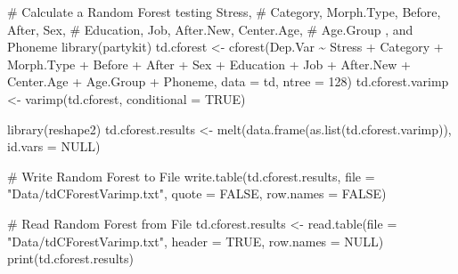 \documentclass[
  10pt,
  letterpaper]{article}
\newenvironment{Shaded}{\begin{snugshade}}{\end{snugshade}}
\newcommand{\AttributeTok}[1]{\textcolor[rgb]{0.40,0.45,0.13}{#1}}
\newcommand{\CommentTok}[1]{\textcolor[rgb]{0.37,0.37,0.37}{#1}}
\newcommand{\ConstantTok}[1]{\textcolor[rgb]{0.56,0.35,0.01}{#1}}
\newcommand{\DecValTok}[1]{\textcolor[rgb]{0.68,0.00,0.00}{#1}}
\newcommand{\FunctionTok}[1]{\textcolor[rgb]{0.28,0.35,0.67}{#1}}
\newcommand{\NormalTok}[1]{\textcolor[rgb]{0.00,0.23,0.31}{#1}}
\newcommand{\OtherTok}[1]{\textcolor[rgb]{0.00,0.23,0.31}{#1}}
\newcommand{\SpecialCharTok}[1]{\textcolor[rgb]{0.37,0.37,0.37}{#1}}
\newcommand{\StringTok}[1]{\textcolor[rgb]{0.13,0.47,0.30}{#1}}
\begin{document}
\begin{Shaded}
\begin{Highlighting}[]
\CommentTok{\# Calculate a Random Forest testing Stress,}
\CommentTok{\# Category, Morph.Type, Before, After, Sex,}
\CommentTok{\# Education, Job, After.New, Center.Age,}
\CommentTok{\# Age.Group , and Phoneme}
\FunctionTok{library}\NormalTok{(partykit)}
\NormalTok{td.cforest }\OtherTok{\textless{}{-}} \FunctionTok{cforest}\NormalTok{(Dep.Var }\SpecialCharTok{\textasciitilde{}}\NormalTok{ Stress }\SpecialCharTok{+}\NormalTok{ Category }\SpecialCharTok{+}
\NormalTok{    Morph.Type }\SpecialCharTok{+}\NormalTok{ Before }\SpecialCharTok{+}\NormalTok{ After }\SpecialCharTok{+}\NormalTok{ Sex }\SpecialCharTok{+}\NormalTok{ Education }\SpecialCharTok{+}
\NormalTok{    Job }\SpecialCharTok{+}\NormalTok{ After.New }\SpecialCharTok{+}\NormalTok{ Center.Age }\SpecialCharTok{+}\NormalTok{ Age.Group }\SpecialCharTok{+}\NormalTok{ Phoneme,}
    \AttributeTok{data =}\NormalTok{ td, }\AttributeTok{ntree =} \DecValTok{128}\NormalTok{)}
\NormalTok{td.cforest.varimp }\OtherTok{\textless{}{-}} \FunctionTok{varimp}\NormalTok{(td.cforest, }\AttributeTok{conditional =} \ConstantTok{TRUE}\NormalTok{)}

\FunctionTok{library}\NormalTok{(reshape2)}
\NormalTok{td.cforest.results }\OtherTok{\textless{}{-}} \FunctionTok{melt}\NormalTok{(}\FunctionTok{data.frame}\NormalTok{(}\FunctionTok{as.list}\NormalTok{(td.cforest.varimp)),}
    \AttributeTok{id.vars =} \ConstantTok{NULL}\NormalTok{)}

\CommentTok{\# Write Random Forest to File}
\FunctionTok{write.table}\NormalTok{(td.cforest.results, }\AttributeTok{file =} \StringTok{"Data/tdCForestVarimp.txt"}\NormalTok{,}
    \AttributeTok{quote =} \ConstantTok{FALSE}\NormalTok{, }\AttributeTok{row.names =} \ConstantTok{FALSE}\NormalTok{)}
\end{Highlighting}
\end{Shaded}

\begin{Shaded}
\begin{Highlighting}[]
\CommentTok{\# Read Random Forest from File}
\NormalTok{td.cforest.results }\OtherTok{\textless{}{-}} \FunctionTok{read.table}\NormalTok{(}\AttributeTok{file =} \StringTok{"Data/tdCForestVarimp.txt"}\NormalTok{,}
    \AttributeTok{header =} \ConstantTok{TRUE}\NormalTok{, }\AttributeTok{row.names =} \ConstantTok{NULL}\NormalTok{)}
\FunctionTok{print}\NormalTok{(td.cforest.results)}
\end{Highlighting}
\end{Shaded}
\end{document}
